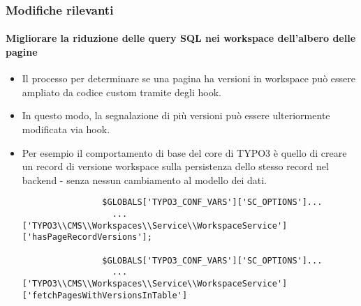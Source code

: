 \begin{frame}[fragile]
	\frametitle{Modifiche rilevanti}
	\framesubtitle{Migliorare la riduzione delle query SQL nei workspace dell'albero delle pagine}

	\lstset{basicstyle=\tiny\ttfamily}

	\begin{itemize}

		\item Il processo per determinare se una pagina ha versioni in workspace può essere ampliato
			da codice custom tramite degli hook.

		\item In questo modo, la segnalazione di più versioni può essere ulteriormente modificata
			via hook.

		\item Per esempio il comportamento di base del core di TYPO3 è quello di creare
			un record di versione workspace sulla persistenza dello stesso record nel backend
			- senza nessun cambiamento al modello dei dati.

			\begin{lstlisting}
				$GLOBALS['TYPO3_CONF_VARS']['SC_OPTIONS']...
				  ...['TYPO3\\CMS\\Workspaces\\Service\\WorkspaceService']['hasPageRecordVersions'];

				$GLOBALS['TYPO3_CONF_VARS']['SC_OPTIONS']...
				  ...['TYPO3\\CMS\\Workspaces\\Service\\WorkspaceService']['fetchPagesWithVersionsInTable']
			\end{lstlisting}

	\end{itemize}

\end{frame}



